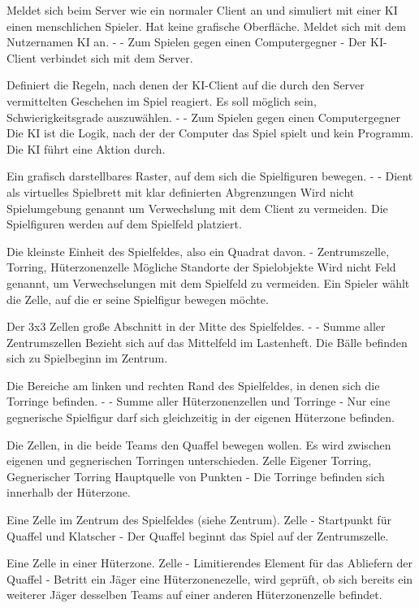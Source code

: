 {Meldet sich beim Server wie ein normaler Client an und simuliert mit einer KI einen menschlichen Spieler. Hat keine grafische Oberfläche. Meldet sich mit dem Nutzernamen \glqq{}KI\grqq{} an.}
{-}
{-}
{Zum Spielen gegen einen Computergegner}
{-}
{Der KI-Client verbindet sich mit dem Server.}

{Definiert die Regeln, nach denen der KI-Client auf die durch den Server vermittelten Geschehen im Spiel reagiert. Es soll möglich sein, Schwierigkeitsgrade auszuwählen.}
{-}
{-}
{Zum Spielen gegen einen Computergegner}
{Die KI ist die Logik, nach der der Computer das Spiel spielt und kein Programm.}
{Die KI führt eine Aktion durch.}

{Ein grafisch darstellbares Raster, auf dem sich die Spielfiguren bewegen.}
{-}
{-}
{Dient als virtuelles Spielbrett mit klar definierten Abgrenzungen}
{Wird nicht Spielumgebung genannt um Verwechslung mit dem Client zu vermeiden.}
{Die Spielfiguren werden auf dem Spielfeld platziert.}

{Die kleinste Einheit des Spielfeldes, also ein Quadrat davon.}
{-}
{Zentrumszelle, Torring, Hüterzonenzelle}
{Mögliche Standorte der Spielobjekte}
{Wird nicht Feld genannt, um Verwechselungen mit dem Spielfeld zu vermeiden.}
{Ein Spieler wählt die Zelle, auf die er seine Spielfigur bewegen möchte.}

{Der 3x3 Zellen große Abschnitt in der Mitte des Spielfeldes.}
{-}
{-}
{Summe aller Zentrumszellen}
{Bezieht sich auf das Mittelfeld im Lastenheft.}
{Die Bälle befinden sich zu Spielbeginn im Zentrum.}

{Die Bereiche am linken und rechten Rand des Spielfeldes, in denen sich die Torringe befinden.}
{-}
{-}
{Summe aller Hüterzonenzellen und Torringe}
{-}
{Nur eine gegnerische Spielfigur darf sich gleichzeitig in der eigenen Hüterzone befinden.}

{Die Zellen, in die beide Teams den Quaffel bewegen wollen. Es wird zwischen eigenen und gegnerischen Torringen unterschieden.}
{Zelle}
{Eigener Torring, Gegnerischer Torring}
{Hauptquelle von Punkten}
{-}
{Die Torringe befinden sich innerhalb der Hüterzone.}

{Eine Zelle im Zentrum des Spielfeldes (siehe Zentrum).}
{Zelle}
{-}
{Startpunkt für Quaffel und Klatscher}
{-}
{Der Quaffel beginnt das Spiel auf der Zentrumszelle.}

{Eine Zelle in einer Hüterzone.}
{Zelle}
{-}
{Limitierendes Element für das Abliefern der Quaffel}
{-}
{Betritt ein Jäger eine Hüterzonenezelle, wird geprüft, ob sich bereits ein weiterer Jäger desselben Teams auf einer anderen Hüterzonenzelle befindet.}

